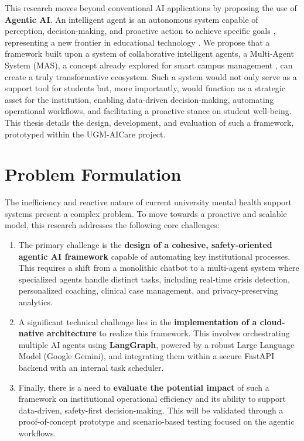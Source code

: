 This research moves beyond conventional AI applications by proposing the use of \textbf{Agentic AI}. An intelligent agent is an autonomous system capable of perception, decision-making, and proactive action to achieve specific goals \cite{saleem2025multiagent}, representing a new frontier in educational technology \cite{salutari2024mas}. We propose that a framework built upon a system of collaborative intelligent agents, a Multi-Agent System (MAS), a concept already explored for smart campus management \cite{salutari2024mas}, can create a truly transformative ecosystem. Such a system would not only serve as a support tool for students but, more importantly, would function as a strategic asset for the institution, enabling data-driven decision-making, automating operational workflows, and facilitating a proactive stance on student well-being. This thesis details the design, development, and evaluation of such a framework, prototyped within the UGM-AICare project.



\section{Problem Formulation}
\label{sec:problem_formulation}

The inefficiency and reactive nature of current university mental health support systems present a complex problem. To move towards a proactive and scalable model, this research addresses the following core challenges:

\begin{enumerate}
    \item The primary challenge is the \textbf{design of a cohesive, safety-oriented agentic AI framework} capable of automating key institutional processes. This requires a shift from a monolithic chatbot to a multi-agent system where specialized agents handle distinct tasks, including real-time crisis detection, personalized coaching, clinical case management, and privacy-preserving analytics.

    \item A significant technical challenge lies in the \textbf{implementation of a cloud-native architecture} to realize this framework. This involves orchestrating multiple AI agents using \textbf{LangGraph}, powered by a robust Large Language Model (Google Gemini), and integrating them within a secure FastAPI backend with an internal task scheduler.

    \item Finally, there is a need to \textbf{evaluate the potential impact} of such a framework on institutional operational efficiency and its ability to support data-driven, safety-first decision-making. This will be validated through a proof-of-concept prototype and scenario-based testing focused on the agentic workflows.
\end{enumerate}

